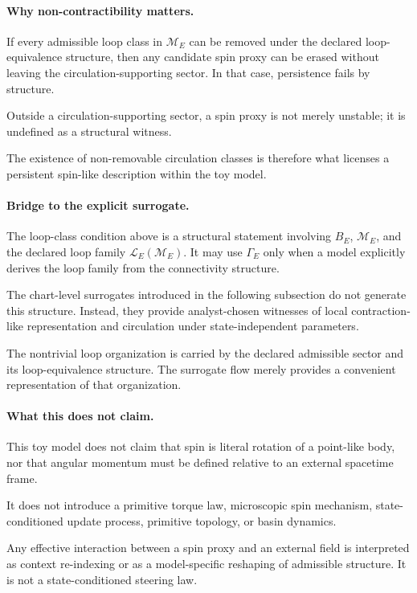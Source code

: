 \documentclass[aps,prx,onecolumn,11pt]{revtex4-2}
\theoremstyle{plain}
\theoremstyle{definition}
\theoremstyle{remark}
\begin{document}
\paragraph{Why non-contractibility matters.}

If every admissible loop class in \(\mathcal M_E\) can be removed under
the declared loop-equivalence structure, then any candidate spin proxy
can be erased without leaving the circulation-supporting sector. In
that case, persistence fails by structure.

Outside a circulation-supporting sector, a spin proxy is not merely
unstable; it is undefined as a structural witness.

The existence of non-removable circulation classes is therefore what
licenses a persistent spin-like description within the toy model.

\paragraph{Bridge to the explicit surrogate.}

The loop-class condition above is a structural statement involving
\(B_E\), \(\mathcal M_E\), and the declared loop family
\(\mathcal L_E(\mathcal M_E)\). It may use \(\Gamma_E\) only when a
model explicitly derives the loop family from the connectivity
structure.

The chart-level surrogates introduced in the following subsection do
not generate this structure. Instead, they provide analyst-chosen
witnesses of local contraction-like representation and circulation under
state-independent parameters.

The nontrivial loop organization is carried by the declared admissible
sector and its loop-equivalence structure. The surrogate flow merely
provides a convenient representation of that organization.

\paragraph{What this does not claim.}

This toy model does not claim that spin is literal rotation of a
point-like body, nor that angular momentum must be defined relative to
an external spacetime frame.

It does not introduce a primitive torque law, microscopic spin
mechanism, state-conditioned update process, primitive topology, or
basin dynamics.

Any effective interaction between a spin proxy and an external field is
interpreted as context re-indexing or as a model-specific reshaping of
admissible structure. It is not a state-conditioned steering law.
\end{document}
